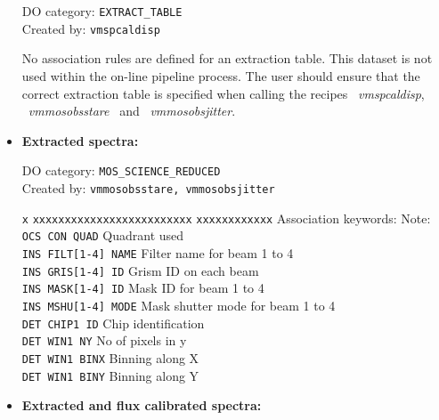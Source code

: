 \begin{itemize}
DO category: {\tt EXTRACT\_TABLE} \\
Created by: {\tt vmspcaldisp}

No association rules are defined for an extraction table. This dataset 
is not used within the on-line pipeline process. The user should ensure 
that the correct extraction table is specified when calling the recipes 
\ {\it vmspcaldisp}, \ {\it vmmosobsstare} \ and \ {\it vmmosobsjitter}.

\item {\bf Extracted spectra:}

DO category: {\tt MOS\_SCIENCE\_REDUCED} \\
Created by: {\tt vmmosobsstare, vmmosobsjitter}

\begin{tabbing}
{\tt x} \= {\tt xxxxxxxxxxxxxxxxxxxxxxxxx} \= {\tt xxxxxxxxxxxx} \kill
\> Association keywords: \> Note: \\
\> {\tt OCS CON QUAD} \> Quadrant used \\
\> {\tt INS FILT[1-4] NAME} \> Filter name for beam 1 to 4 \\
\> {\tt INS GRIS[1-4] ID} \> Grism ID on each beam \\
\> {\tt INS MASK[1-4] ID} \> Mask ID for beam 1 to 4\\
\> {\tt INS MSHU[1-4] MODE} \> Mask shutter mode for beam 1 to 4\\
\> {\tt DET CHIP1 ID} \> Chip identification \\
\> {\tt DET WIN1 NY} \> No of pixels in y \\
\> {\tt DET WIN1 BINX} \> Binning along X \\
\> {\tt DET WIN1 BINY} \> Binning along Y \\
\end{tabbing}

\item {\bf Extracted and flux calibrated spectra:}



\end{itemize}
